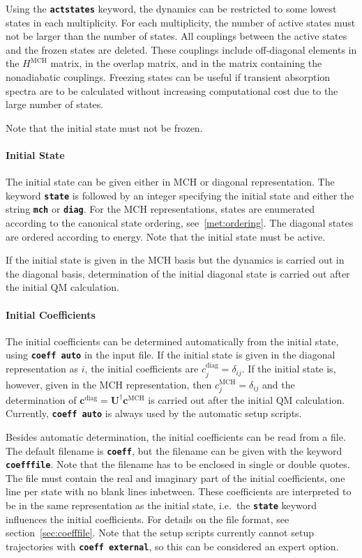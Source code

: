 \documentclass[a4paper,10pt,DIV=15,openany]{scrbook}
\newcommand{\ttt}[1]{\textbf{\texttt{#1}}}
\newcommand{\VEC}[1]{\ensuremath{\mathbf{#1}}}
\begin{document}
Using the \ttt{actstates} keyword, the dynamics can be restricted to some lowest states in each multiplicity. For each multiplicity, the number of active states must not be larger than the number of states. All couplings between the active states and the frozen states are deleted. These couplings include off-diagonal elements in the $H^{\text{MCH}}$ matrix, in the overlap matrix, and in the matrix containing the nonadiabatic couplings. Freezing states can be useful if transient absorption spectra are to be calculated without increasing computational cost due to the large number of states.

Note that the initial state must not be frozen.

\paragraph{Initial State}

The initial state can be given either in MCH or diagonal representation. The keyword \ttt{state} is followed by an integer specifying the initial state and either the string \ttt{mch} or \ttt{diag}. For the MCH representations, states are enumerated according to the canonical state ordering, see~\ref{met:ordering}. The diagonal states are ordered according to energy. Note that the initial state must be active. 

If the initial state is given in the MCH basis but the dynamics is carried out in the diagonal basis, determination of the initial diagonal state is carried out after the initial QM calculation.

\paragraph{Initial Coefficients}

The initial coefficients can be determined automatically from the initial state, using \ttt{coeff auto} in the input file. If the initial state is given in the diagonal representation as $i$, the initial coefficients are $c^{\text{diag}}_j=\delta_{ij}$. If the initial state is, however, given in the MCH representation, then $c^{\text{MCH}}_j=\delta_{ij}$ and the determination of $\VEC{c}^{\text{diag}}=\VEC{U}^\dagger\VEC{c}^{\text{MCH}}$ is carried out after the initial QM calculation. 
Currently, \ttt{coeff auto} is always used by the automatic setup scripts.

Besides automatic determination, the initial coefficients can be read from a file. The default filename is \ttt{coeff}, but the filename can be given with the keyword \ttt{coefffile}. Note that the filename has to be enclosed in single or double quotes. The file must contain the real and imaginary part of the initial coefficients, one line per state with no blank lines inbetween. These coefficients are interpreted to be in the same representation as the initial state, i.e.\ the \ttt{state} keyword influences the initial coefficients. For details on the file format, see section~\ref{sec:coefffile}.
Note that the setup scripts currently cannot setup trajectories with \ttt{coeff external}, so this can be considered an expert option.
\end{document}
